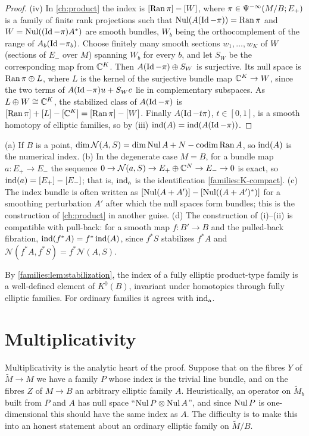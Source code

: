 \begin{proof}
  (iv) In \cref{ch:product} the index is $[\operatorname{Ran}\pi]-[W]$, where
  $\pi\in\Psi^{-\infty}(M/B;E_+)$ is a family of finite rank projections such
  that $\operatorname{Nul}(A(\operatorname{Id}-\pi))=\operatorname{Ran}\pi$ and $W=\operatorname{Nul}((\operatorname{Id}-\pi)A^*)$ are smooth
  bundles, $W_b$ being the orthocomplement of the range of $A_b(\operatorname{Id}-\pi_b)$.
  Choose finitely many smooth sections $w_1,\dots,w_K$ of $W$ (sections of
  $E_-$ over $M$) spanning $W_b$ for every $b$, and let $S_W$ be the
  corresponding map from $\mathbb{C}^K$. Then $A(\operatorname{Id}-\pi)\oplus S_W$ is surjective. Its
  null space is $\operatorname{Ran}\pi\oplus L$, where $L$ is the kernel of the surjective
  bundle map $\mathbb{C}^K\to W$, since the two terms of $A(\operatorname{Id}-\pi)u+S_Wc$ lie in
  complementary subspaces. As $L\oplus W\cong\mathbb{C}^K$, the stabilized class of
  $A(\operatorname{Id}-\pi)$ is $[\operatorname{Ran}\pi]+[L]-[\mathbb{C}^K]=[\operatorname{Ran}\pi]-[W]$. Finally
  $A(\operatorname{Id}-t\pi)$, $t\in[0,1]$, is a smooth homotopy of elliptic families, so by
  (iii) $\operatorname{ind}(A)=\operatorname{ind}(A(\operatorname{Id}-\pi))$.
\end{proof}

\begin{remark}\label{families:rem:stab-remarks}
  (a) If $B$ is a point, $\dim\mathcal N(A,S)=\dim\operatorname{Nul} A+N-\operatorname{codim}
  \operatorname{Ran} A$, so $\operatorname{ind}(A)$ is the numerical index. (b) In the degenerate case
  $M=B$, for a bundle map $a:E_+\to E_-$ the sequence $0\to\mathcal N(a,S)\to
  E_+\oplus\mathbb{C}^N\to E_-\to0$ is exact, so $\operatorname{ind}(a)=[E_+]-[E_-]$; that is,
  $\operatorname{ind}_{\mathrm{a}}$ is the identification \ref{families:K-compact}. (c) The index bundle
  is often written as $[\operatorname{Nul}(A+A')]-[\operatorname{Nul}((A+A')^*)]$ for a smoothing
  perturbation $A'$ after which the null spaces form bundles; this is the
  construction of \cref{ch:product} in another guise. (d) The construction of
  (i)--(ii) is compatible with pull-back: for a smooth map $f:B'\to B$ and the
  pulled-back fibration, $\operatorname{ind}(f^*A)=f^*\operatorname{ind}(A)$, since $f^*S$ stabilizes $f^*A$
  and $\mathcal N(f^*A,f^*S)=f^*\mathcal N(A,S)$.
\end{remark}

By \cref{families:lem:stabilization}, the index of a fully elliptic
product-type family is a well-defined element of $K^0(B)$, invariant under
homotopies through fully elliptic families. For ordinary families it agrees with
$\operatorname{ind}_{\mathrm{a}}$.

\section{Multiplicativity}\label{families:sec:mult}

Multiplicativity is the analytic heart of the proof. Suppose that on the fibres
$Y$ of $\tilde M\to M$ we have a family $P$ whose index is the trivial line
bundle, and on the fibres $Z$ of $M\to B$ an arbitrary elliptic family $A$.
Heuristically, an operator on $\tilde M_b$ built from $P$ and $A$ has null space
``$\operatorname{Nul} P\otimes\operatorname{Nul} A$'', and since $\operatorname{Nul} P$ is one-dimensional this should have
the same index as $A$. The difficulty is to make this into an honest statement
about an ordinary elliptic family on $\tilde M/B$.

